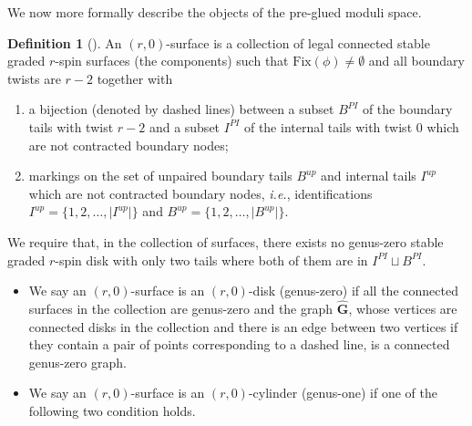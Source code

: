 \documentclass[11pt]{amsart}
\theoremstyle{definition}
\newtheorem{dfn}[dummy]{Definition}
\theoremstyle{remark}
\newcommand{\<}{\left<}
\renewcommand{\>}{\right>}
\numberwithin{equation}{section}
\begin{document}
We %
now more formally describe the objects of the pre-glued moduli space.
\begin{dfn}[{\cite[Definition 4.3]{TZ1}}]\label{dfn rh disk}
    An $(r,0)$-surface is a collection of legal connected  stable graded $r$-spin surfaces (the components) such that $\text{Fix}(\phi)\ne \emptyset$ and all boundary twists are %
$r-2$ together %
with
    \begin{enumerate}
        \item a bijection (denoted by dashed lines) between a subset $B^{PI}$ of the boundary tails with twist $r-2$ and a subset $I^{PI}$ of the internal tails with twist $0$ which are not contracted boundary nodes;
        \item markings on the set of unpaired boundary tails $B^{up}$ and internal tails $I^{up}$ which are not contracted boundary %
nodes, \textit{i.e.}, identifications %
$I^{up}=\{1,2,\dots,\lvert I^{up}\rvert\}$ and $B^{up}=\{1,2,\dots,\lvert B^{up}\rvert\}$.
    \end{enumerate}
    We require that, in the collection of surfaces, there exists no genus-zero stable graded $r$-spin disk with only %
two tails where %
both of them are in $I^{PI}\sqcup B^{PI}$.
    \begin{itemize}
        \item  We say an $(r,0)$-surface is an $(r,0)$-disk (genus-zero) if all %
the connected surfaces %
in the collection %
are genus-zero and %
the graph $\hat{\mathbf{G}}$, whose vertices are connected disks in the collection and there is an edge between two vertices if they contain a pair of points corresponding to a dashed line, is a connected genus-zero graph.
        \item  We say an $(r,0)$-surface is an $(r,0)$-cylinder (genus-one) if one of the following two condition holds. 

\end{itemize}
\end{dfn}
\end{document}
